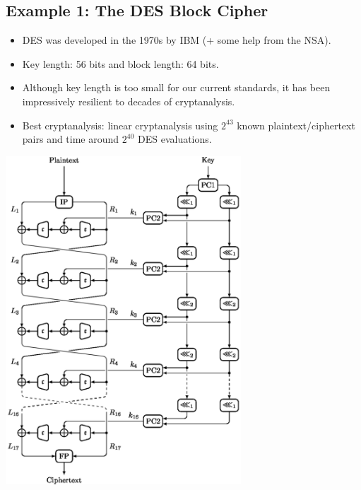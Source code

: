 	\subsection{Example 1: The DES Block Cipher}
		\begin{itemize}
			\item DES was developed in the 1970s by IBM (+ some help from the NSA).
			\item Key length: 56 bits and block length: 64 bits.
			\item Although key length is too small for our current standards, it has been impressively resilient to decades of cryptanalysis.
			\item Best cryptanalysis: linear cryptanalysis using $2^{43}$ known plaintext/ciphertext pairs and time around $2^{40}$ DES evaluations.
		\end{itemize}
	    \begin{center}
			\includegraphics[width=88mm]{Graphics/Block Ciphers/bc3.png}
		\end{center}
